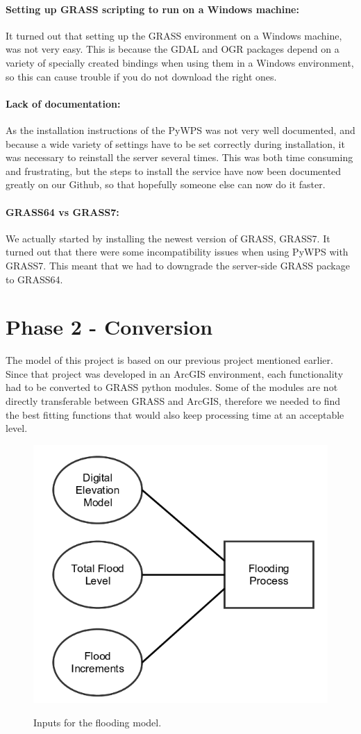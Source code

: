 \paragraph{Setting up GRASS scripting to run on a Windows machine:} It turned out that setting up the GRASS environment on a Windows machine, was not very easy. This is because the GDAL and OGR packages depend on a variety of specially created bindings when using them in a Windows environment, so this can cause trouble if you do not download the right ones.\\

\paragraph{Lack of documentation:} As the installation instructions of the PyWPS was not very well documented, and because a wide variety of settings have to be set correctly during installation, it was necessary to reinstall the server several times. This was both time consuming and frustrating, but the steps to install the service have now been documented greatly on our Github, so that hopefully someone else can now do it faster. 

\paragraph{GRASS64 vs GRASS7:} We actually started by installing the newest version of GRASS, GRASS7. It turned out that there were some  incompatibility issues when using PyWPS with GRASS7. This meant that we had to downgrade the server-side GRASS package to GRASS64.\\

\section{Phase 2 - Conversion}
\label{ch:phase2}
The model of this project is based on our previous project mentioned earlier. Since that project was developed in an ArcGIS environment, each functionality had to be converted to GRASS python modules. Some of the modules are not directly transferable between GRASS and ArcGIS, therefore we needed to find the best fitting functions that would also keep processing time at an acceptable level.\\

\begin{figure}[h!]
\centering
	{\includegraphics[width=.45\linewidth]{gfx/Phase_2/image.png}}
\caption{Inputs for the flooding model.}
\label{fig:inputs}
\end{figure}\\

